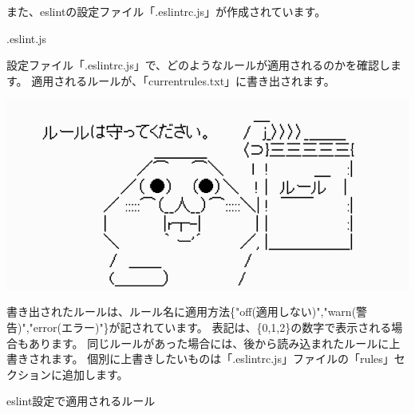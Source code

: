 また、eslintの設定ファイル「.eslintrc.js」が作成されています。

\def\startercodeblockfontsize{}
\begin{starterprogram}[]{.eslint.js}\end{starterprogram}

設定ファイル「.eslintrc.js」で、どのようなルールが適用されるのかを確認します。
適用されるルールが、「current\textunderscore{}rules.txt」に書き出されます。

\begin{reviewimage}[H]%
\includegraphics[width=0.7\maxwidth]{./images/02-create-react-app/rules.png}%
\label{image:02-create-react-app:rules}
\end{reviewimage}
\vspace*{\baselineskip}

書き出されたルールは、ルール名に適用方法\{"off(適用しない)","warn(警告)","error(エラー)"\}が記されています。
表記は、\{0,1,2\}の数字で表示される場合もあります。
同じルールがあった場合には、後から読み込まれたルールに上書きされます。
個別に上書きしたいものは「.eslintrc.js」ファイルの「rules」セクションに追加します。

\def\startercodeblockfontsize{}
\begin{starterterminal}[]{eslint設定で適用されるルール}\end{starterterminal}

